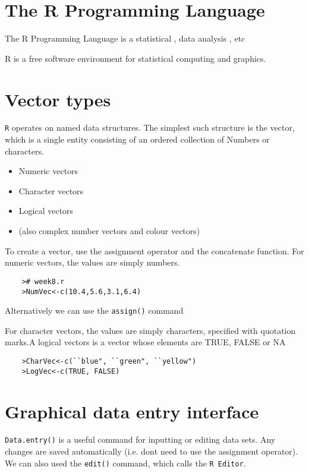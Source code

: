 \documentclass[a4paper,12pt]{article}
\begin{document}
	
	\tableofcontents
	\newpage
	\section{The R Programming Language}
	
	The R Programming Language is a statistical , data analysis , etc
	
	R is a free software environment for statistical computing and graphics.
	

	\section{Vector types}
	\texttt{R} operates on named data structures. The simplest such structure is the
	vector, which is a single entity consisting of an ordered collection of
	Numbers or characters.
	
	\begin{itemize}
		\item Numeric vectors
		\item Character vectors
		\item Logical vectors
		\item (also complex number vectors and colour vectors)
	\end{itemize}
	
	To create a vector, use the assignment operator and the concatenate function.
	For numeric vectors, the values are simply numbers.
	
	\begin{verbatim}
	># week8.r
	>NumVec<-c(10.4,5.6,3.1,6.4)
	\end{verbatim}
	
	Alternatively we can use the \texttt{assign()} command
	
	For character vectors, the values are simply characters, specified with
	quotation marks.A logical vectors is a vector whose elements are TRUE, FALSE or NA
	
	\begin{verbatim}
	>CharVec<-c(``blue", ``green", ``yellow")
	>LogVec<-c(TRUE, FALSE)
	\end{verbatim}
	
	\section{Graphical data entry interface}
	
	\texttt{Data.entry()} is a useful  command for inputting or editing data sets. Any
	changes are saved automatically (i.e. dont need to use the assignment
	operator). We can also used the \texttt{edit()} command, which calls the \texttt{R Editor}.
	
\end{document}
